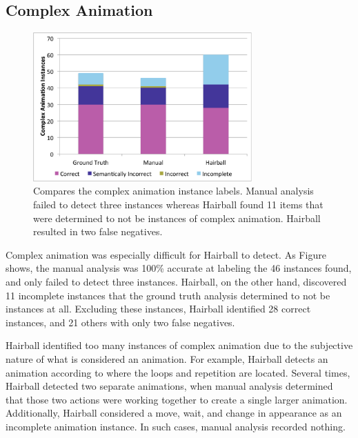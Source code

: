 \subsection{Complex Animation}

\begin{figure}[!t]
\centering \includegraphics[trim=.3in .15in .3in .15in, clip,
  width=3.3in]{graphs/AutoAnimation.eps}
\caption{Compares the complex animation instance labels. Manual analysis failed
  to detect three instances whereas Hairball found 11 items that were
  determined to not be instances of complex animation. Hairball resulted in two
  false negatives.}
\end{figure}

Complex animation was especially difficult for Hairball to detect.  As
Figure~ shows, the manual analysis was 100\% accurate
at labeling the 46 instances found, and only failed to detect three
instances. Hairball, on the other hand, discovered 11 incomplete instances that
the ground truth analysis determined to not be instances at all. Excluding
these instances, Hairball identified 28 correct instances, and 21 others with
only two false negatives.

Hairball identified too many instances of complex animation due to the
subjective nature of what is considered an animation.  For example, Hairball
detects an animation according to where the loops and repetition are
located. Several times, Hairball detected two separate animations, when manual
analysis determined that those two actions were working together to create a
single larger animation. Additionally, Hairball considered a move, wait, and
change in appearance as an incomplete animation instance. In such cases, manual
analysis recorded nothing.

